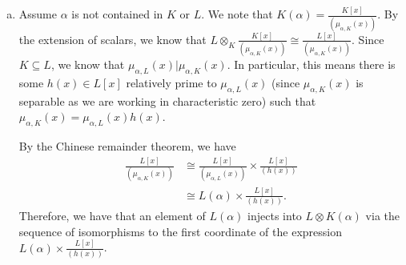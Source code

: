 \documentclass[10pt]{mypackage}
\begin{document}
\begin{solution}
\begin{enumerate}[(a)]
\begin{align*}
                                                                                                                                      &= \ell_1\ell_2p_1(\alpha)p_2(\alpha)\\
                                                                                                                                      &= \ell_1p_1(\alpha)\ell_2p_2(\alpha)\\
                                                                                                                                      &= \rho\left( \ell_1\otimes p_1(\alpha) \right)\rho\left( \ell_2\otimes p_2(\alpha) \right).
      \end{align*}
      Next, we observe that, since $\alpha$ is algebraic over $K$, $\alpha$ is algebraic over $L$, so $L(\alpha) = L\left[ \alpha \right]$. We can show that any polynomial $q\in L[x]$ evaluated at $\alpha$ is obtained by a sum of simple tensors as follows:
      \begin{align*}
        q(\alpha) &= a_n\alpha^{n} + a_{n-1}\alpha^{n-1} + \cdots + a_1 \alpha + a_0\\
                  &= \rho\left( a_n\otimes \alpha^{n} \right) + \cdots + \rho\left( a_1\otimes \alpha \right) + \rho\left( a_0\otimes 1 \right)\\
                  &= \rho\left( \sum_{i=0}^{n}a_i\otimes \alpha^{i} \right).
      \end{align*}
      Thus, $\rho$ is surjective.
    \item Assume $\alpha$ is not contained in $K$ or $L$. We note that $K\left( \alpha \right) = \frac{K\left[ x \right]}{\left( \mu_{\alpha,K}(x) \right)}$. By the extension of scalars, we know that $L\otimes_{K}\frac{K\left[ x \right]}{\left( \mu_{\alpha,K}(x) \right)}\cong \frac{L\left[ x \right]}{\left( \mu_{\alpha,K}(x) \right)}$. Since $K\subseteq L$, we know that $\mu_{\alpha,L}(x) | \mu_{\alpha,K}(x)$. In particular, this means there is some $h(x)\in L[x]$ relatively prime to $\mu_{\alpha,L}(x)$ (since $\mu_{\alpha,K}(x)$ is separable as we are working in characteristic zero) such that $\mu_{\alpha,K}(x) = \mu_{\alpha,L}(x) h(x)$.

      By the Chinese remainder theorem, we have
      \begin{align*}
        \frac{L[x]}{\left( \mu_{\alpha,K}(x) \right)} &\cong \frac{L\left[ x \right]}{\left( \mu_{\alpha,L}(x) \right)}\times \frac{L[x]}{\left( h(x) \right)}\\
                                                      &\cong L\left( \alpha \right)\times \frac{L\left[ x \right]}{\left( h(x) \right)}.
      \end{align*}
      Therefore, we have that an element of $L\left( \alpha \right)$ injects into $L\otimes K\left( \alpha \right)$ via the sequence of isomorphisms to the first coordinate of the expression $L\left( \alpha \right)\times \frac{L\left[ x \right]}{\left( h(x) \right)}$.


\end{enumerate}
\end{solution}
\end{document}
